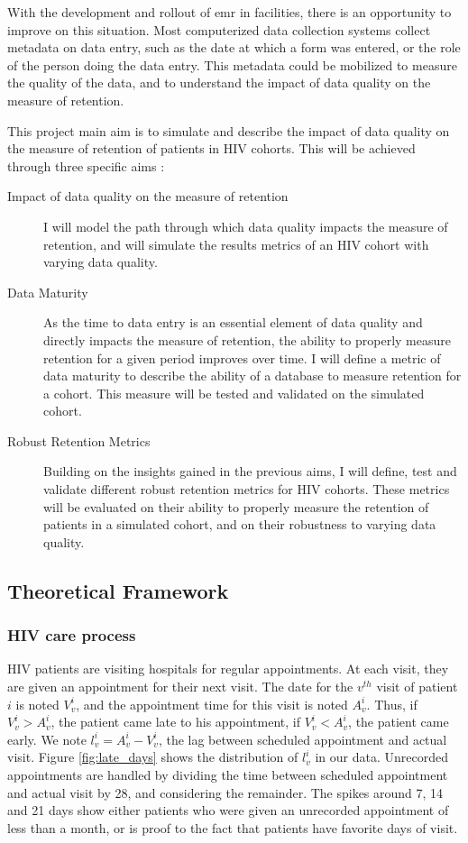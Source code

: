 With the development and rollout of \gls{emr} in facilities, there is an opportunity to improve on this situation. Most computerized data collection systems collect metadata on data entry, such as the date at which a form was entered, or the role of the person doing the data entry. This metadata could be mobilized to measure the quality of the data, and to understand the impact of data quality on the measure of retention.

This project main aim is to simulate and describe the impact of data quality on the measure of retention of patients in HIV cohorts. This will be achieved through three specific aims :

\begin{description}
	\item[Impact of data quality on the measure of retention] I will model the path through which data quality impacts the measure of retention, and will simulate the results metrics of an HIV cohort with varying data quality.
	\item[Data Maturity] As the time to data entry is an essential element of data quality and directly impacts the measure of retention, the ability to properly measure retention for a given period improves over time. I will define a metric of data maturity to describe the ability of a database to measure retention for a cohort. This measure will be tested and validated on the simulated cohort.
	\item[Robust Retention Metrics] Building on the insights gained in the previous aims, I will define, test and validate different robust retention metrics for HIV cohorts. These metrics will be evaluated on their ability to properly measure the retention of patients in a simulated cohort, and on their robustness to varying data quality.
\end{description}


\subsection{Theoretical Framework}

\subsubsection{HIV care process}

HIV patients are visiting hospitals for regular appointments. At each visit, they are given an appointment for their next visit. The date for the $v^{th}$ visit of patient $i$ is noted $V_v^i$, and the appointment time for this visit is noted $A_v^i$. Thus, if $V_v^i > A_v^i$, the patient came late to his appointment, if $V_v^i < A_v^i$, the patient came early. We note $l_v^i = A_v^i - V_v^i$, the lag between scheduled appointment and actual visit. Figure \ref{fig:late_days} shows the distribution of $l_v^i$ in our data. Unrecorded appointments are handled by dividing the time between scheduled appointment and actual visit by 28, and considering the remainder. The spikes around 7, 14 and 21 days show either patients who were given an unrecorded appointment of less than a month, or is proof to the fact that patients have favorite days of visit.

